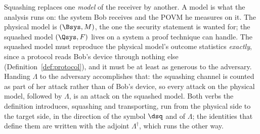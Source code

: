 
Squashing replaces one \emph{model} of the receiver by another. A model is what
the analysis runs on: the system Bob receives and the POVM he measures on it.
The physical model is $(\Bsys,M)$, the one the security statement is wanted
for; the squashed model $(\Qsys,F)$ lives on a system a proof technique can
handle. The squashed model must reproduce the physical model's outcome
statistics \emph{exactly}, since a protocol reads Bob's device through nothing
else (Definition~\ref{def:protocol}), and it must be at least as generous to
the adversary. Handing $\Lambda$ to the adversary accomplishes that: the
squashing channel is counted as part of her attack rather than of Bob's
device, so every attack on the physical model, followed by $\Lambda$, is an
attack on the squashed model. Both verbs the definition introduces, squashing
and transporting, run from the physical side to the target side, in the
direction of the symbol $\dsq$ and of $\Lambda$; the identities that define
them are written with the adjoint $\Lambda^{\dagger}$, which runs the other
way.

